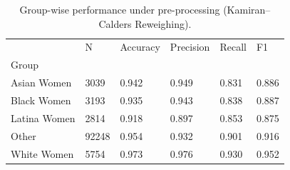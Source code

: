 \begin{table}[htbp]
\centering
\caption{Group-wise performance under pre-processing (Kamiran–Calders Reweighing).}
\label{tab:10-reweigh-group-metrics}
\begin{tabular}{llllll}
\toprule
 & N & Accuracy & Precision & Recall & F1 \\
Group &  &  &  &  &  \\
\midrule
Asian Women & 3039 & 0.942 & 0.949 & 0.831 & 0.886 \\
Black Women & 3193 & 0.935 & 0.943 & 0.838 & 0.887 \\
Latina Women & 2814 & 0.918 & 0.897 & 0.853 & 0.875 \\
Other & 92248 & 0.954 & 0.932 & 0.901 & 0.916 \\
White Women & 5754 & 0.973 & 0.976 & 0.930 & 0.952 \\
\bottomrule
\end{tabular}

\end{table}